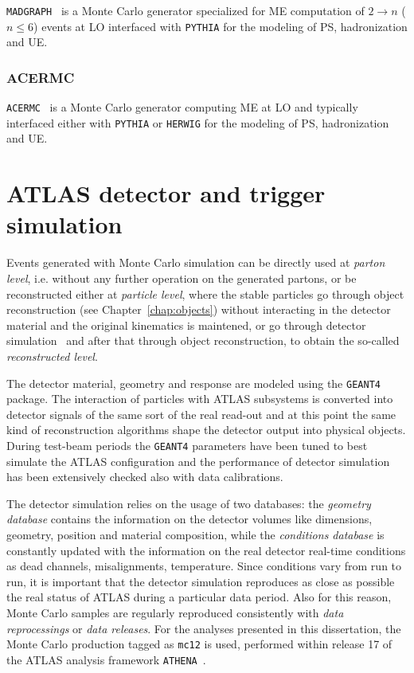 \texttt{MADGRAPH}~\cite{madgraph} is a Monte Carlo generator 
specialized for ME computation of $2 \to n$ ($n\leq 6$) events at LO
interfaced with \texttt{PYTHIA} for the modeling of PS, hadronization and UE.


\subsubsection*{ACERMC}

\texttt{ACERMC}~\cite{acermc} is a Monte Carlo generator computing
ME at LO and typically interfaced either with \texttt{PYTHIA} or 
\texttt{HERWIG} for the modeling of PS, hadronization and UE.



\section{ATLAS detector and trigger simulation}\label{sec:MCdetector}

Events generated with Monte Carlo simulation can be directly
used at {\it parton level}, i.e. without any further operation on the
generated partons, or be reconstructed either at {\it particle level}, where
the stable particles go through object reconstruction (see Chapter~\ref{chap:objects})
without interacting in the detector material and the original kinematics is
maintened, or go through detector simulation~\cite{atlas_sim} and after that through object
reconstruction, to obtain the so-called {\it reconstructed level}.

The detector material, geometry and response %
are modeled using the {\tt GEANT4}~\cite{geant} package.
The interaction of particles with ATLAS subsystems is converted
into detector signals of the same sort of the real read-out and
at this point the same kind of reconstruction algorithms shape
the detector output into physical objects. During test-beam periods
the \texttt{GEANT4} parameters have been tuned to best simulate
the ATLAS configuration and the performance of detector simulation
has been extensively checked also with data calibrations.

The detector simulation relies on the usage of two databases: the 
{\it geometry database} contains the information on the detector volumes
like dimensions, geometry, position and material composition, while
the {\it conditions database} is constantly updated with the information
on the real detector real-time conditions as dead channels, misalignments,
temperature. Since conditions vary from run to run, it is important that
the detector simulation reproduces as close as possible the real status
of ATLAS during a particular data period. Also for this reason, Monte
Carlo samples are regularly reproduced consistently with {\it data reprocessings}
or {\it data releases}.  For the analyses presented in this dissertation,
the Monte Carlo production tagged as \texttt{mc12} is used, performed
within release 17 of the ATLAS analysis framework \texttt{ATHENA}~\cite{athena}.



